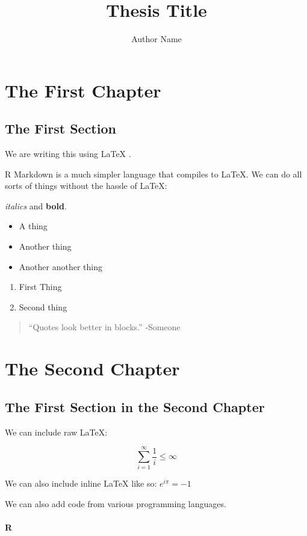 \documentclass[final,12pt,]{CSUNthesis}
\author{Author Name}
\title{Thesis Title}
\newcommand\citep{\cite}
\begin{document}
\chapter{The First Chapter}\label{the-first-chapter}

\section{The First Section}\label{the-first-section}

We are writing this using LaTeX \citep{latex}.

R Markdown is a much simpler language that compiles to LaTeX. We can do
all sorts of things without the hassle of LaTeX:

\emph{italics} and \textbf{bold}.

\begin{itemize}
\item
  A thing
\item
  Another thing
\item
  Another another thing
\end{itemize}

\begin{enumerate}
\def\labelenumi{\arabic{enumi}.}
\item
  First Thing
\item
  Second thing
\end{enumerate}

\begin{quote}
``Quotes look better in blocks.'' -Someone
\end{quote}

\chapter{The Second Chapter}\label{the-second-chapter}

\section{The First Section in the Second
Chapter}\label{the-first-section-in-the-second-chapter}

We can include raw LaTeX:

\[ \sum_{i=1}^{\infty} \frac{1}{i} \leq \infty \]

We can also include inline LaTeX like so: \(e^{i \pi}=-1\)

We can also add code from various programming languages.

\subsubsection{R}\label{r}
\end{document}
